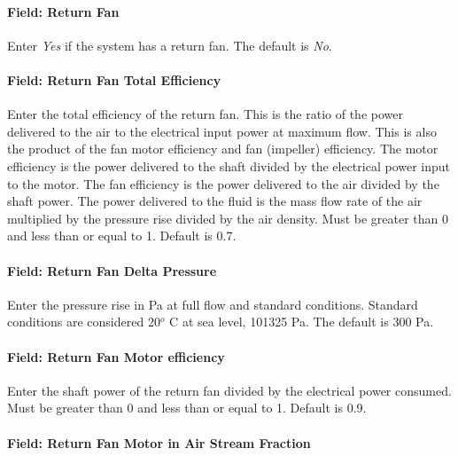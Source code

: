 \paragraph{Field: Return Fan}\label{field-return-fan}

Enter \emph{Yes} if the system has a return fan. The default is \emph{No}.

\paragraph{Field: Return Fan Total Efficiency}\label{field-return-fan-total-efficiency}

Enter the total efficiency of the return fan. This is the ratio of the power delivered to the air to the electrical input power at maximum flow. This is also the product of the fan motor efficiency and fan (impeller) efficiency. The motor efficiency is the power delivered to the shaft divided by the electrical power input to the motor. The fan efficiency is the power delivered to the air divided by the shaft power. The power delivered to the fluid is the mass flow rate of the air multiplied by the pressure rise divided by the air density. Must be greater than 0 and less than or equal to 1. Default is 0.7.

\paragraph{Field: Return Fan Delta Pressure}\label{field-return-fan-delta-pressure-2}

Enter the pressure rise in Pa at full flow and standard conditions. Standard conditions are considered 20\(^{o}\) C at sea level, 101325 Pa. The default is 300 Pa.

\paragraph{Field: Return Fan Motor efficiency}\label{field-return-fan-motor-efficiency-2}

Enter the shaft power of the return fan divided by the electrical power consumed. Must be greater than 0 and less than or equal to 1. Default is 0.9.

\paragraph{Field: Return Fan Motor in Air Stream Fraction}\label{field-return-fan-motor-in-air-stream-fraction-2}

